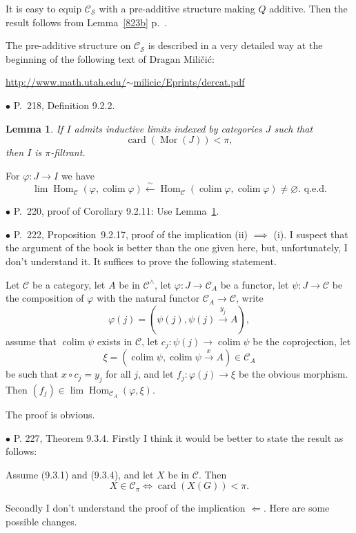 \documentclass[12pt]{article}
\newtheorem{lem}[thm]{Lemma}
\theoremstyle{remark}%
\newcommand{\bu}{\bullet}
\newcommand{\n}{\noindent}
\newcommand{\cc}{\mathcal}
\newcommand{\C}{\mathcal C}
\newcommand{\p}{\varphi}
\newcommand{\xr}{\xrightarrow}
\newcommand{\be}{\begin{equation}}
\newcommand{\ee}{\end{equation}}
\newcommand{\pr}{Proposition}
\DeclareMathOperator*{\co}{colim}
\DeclareMathOperator{\ca}{card}
\DeclareMathOperator{\h}{Hom}
\DeclareMathOperator{\Mor}{Mor}
\begin{document}
It is easy to equip $\C_{\cc S}$ with a pre-additive structure making $Q$ additive. Then the result follows from Lemma~\ref{823b} p.~\pageref{823b}. 

The pre-additive structure on $\C_{\cc S}$ is described in a very detailed way at the beginning of the following text of Dragan Mili\v{c}i\'c:\bigskip 

\centerline{\href{http://www.math.utah.edu/~milicic/Eprints/dercat.pdf}{http://www.math.utah.edu/$\sim$milicic/Eprints/dercat.pdf}}\bigskip 


\n$\bu$ P.~218, Definition 9.2.2. 
%
\begin{lem}\label{922}
If $I$ admits inductive limits indexed by categories $J$ such that 
$$
\operatorname{card}(\Mor(J))<\pi,
$$ 
then $I$ is $\pi$-filtrant. 
\end{lem}
%
\n{\em Proof.} For $\p:J\to I$ we have
$$
\lim\h_\C(\p,\co\p)\xleftarrow\sim\h_\C(\co\p,\co\p)\neq\varnothing.\text{ q.e.d.}
$$ 


\n$\bu$ P.~220, proof of Corollary 9.2.11: Use Lemma~\ref{922}.


\n$\bu$ P.~222, \pr\ 9.2.17, proof of the implication (ii) $\implies$ (i). I suspect that the argument of the book is better than the one given here, but, unfortunately, I don't understand it. It suffices to prove the following statement. 

Let $\C$ be a category, let $A$ be in $\C^\wedge$, let $\p:J\to\C_A$ be a functor, let $\psi:J\to\C$ be the composition of $\p$ with the natural functor $\C_A\to\C$, write 
$$
\p(j)=(\psi(j),\psi(j)\xr{y_j}A),
$$ 
assume that $\co\psi$ exists in $\C$, let $c_j:\psi(j)\to\co\psi$ be the coprojection, let 
$$
\xi=(\co\psi,\co\psi\xr x A)\in\C_A
$$ 
be such that $x\circ c_j=y_j$ for all $j$, and let $f_j:\p(j)\to\xi$ be the obvious morphism. Then $(f_j)\in\lim\h_{\C_A}(\p,\xi)$. 

The proof is obvious. 


\n$\bu$ P. 227, Theorem 9.3.4. Firstly I think it would be better to state the result as follows:

Assume (9.3.1) and (9.3.4), and let $X$ be in $\C$. Then 
\be\label{934}
X\in\C_\pi\iff\ca(X(G))<\pi.
\ee 

Secondly I don't understand the proof of the implication $\Leftarrow$. Here are some possible changes. 
\end{document}
